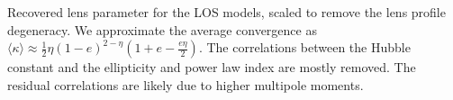\label{fig:scaled_triangle} Recovered lens parameter for the LOS models, scaled to remove the lens profile degeneracy. We approximate the average convergence as $\langle \kappa \rangle \approx \frac{1}{2} \eta  (1 - e)^{2 - \eta} \left(1 +  e - \frac{e \eta }{2}\right).$ The correlations between the Hubble constant and the ellipticity and power law index are mostly removed. The residual correlations are likely due to higher multipole moments.